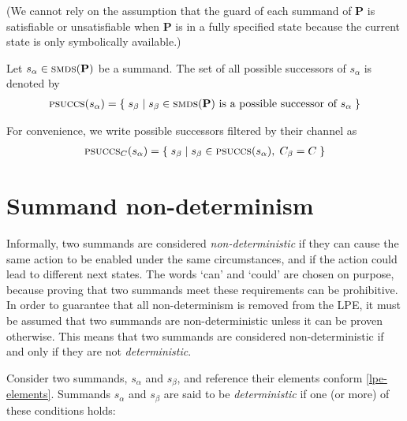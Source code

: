 (We cannot rely on the assumption that the guard of each summand of $\mathbf{P}$ is satisfiable or unsatisfiable when $\mathbf{P}$ is in a fully specified state because the current state is only symbolically available.)

\vspace{2mm}

Let $s_\alpha \in \textsc{smds}(\mathbf{P})$ be a summand.
The set of all possible successors of $s_\alpha$ is denoted by
\begin{align*}
\textsc{psuccs}(s_\alpha) = \{\;s_\beta\;|\;\text{$s_\beta \in \textsc{smds}(\mathbf{P})$ is a possible successor of $s_\alpha$}\;\}
\end{align*}

For convenience, we write possible successors filtered by their channel as
\begin{align*}
\textsc{psuccs}_{C}(s_\alpha) = \{\;s_\beta\;|\;s_\beta \in \textsc{psuccs}(s_\alpha),\; C_\beta = C\;\}
\end{align*}

\clearpage
\section{Summand non-determinism}

Informally, two summands are considered \emph{non-deterministic} if they can cause the same action to be enabled under the same circumstances, and if the action could lead to different next states.
The words `can' and `could' are chosen on purpose, because proving that two summands meet these requirements can be prohibitive.
In order to guarantee that all non-determinism is removed from the LPE, it must be assumed that two summands are non-deterministic unless it can be proven otherwise.
This means that two summands are considered non-deterministic if and only if they are not \emph{deterministic}.

Consider two summands, $s_\alpha$ and $s_\beta$, and reference their elements conform \ref{lpe-elements}.
Summands $s_\alpha$ and $s_\beta$ are said to be \emph{deterministic} if one (or more) of these conditions holds:

